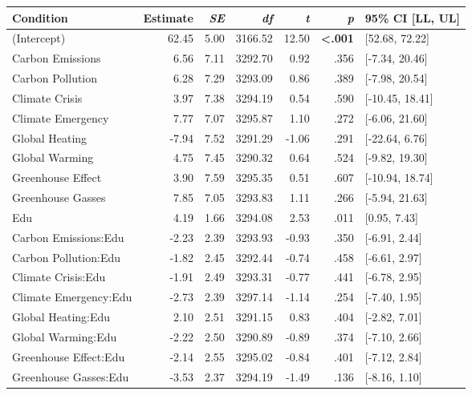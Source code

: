 \begin{table}[ht]
\centering
\begin{tabular}{lrrrrrl}
  \hline
Condition & Estimate & \textit{SE} & \textit{df} & \textit{t} & \textit{p} & 95\% CI [LL, UL] \\ 
  \hline
(Intercept) & 62.45 & 5.00 & 3166.52 & 12.50 & \textbf{\textless  .001} & [52.68, 72.22] \\ 
  Carbon Emissions & 6.56 & 7.11 & 3292.70 & 0.92 & .356 & [-7.34, 20.46] \\ 
  Carbon Pollution & 6.28 & 7.29 & 3293.09 & 0.86 & .389 & [-7.98, 20.54] \\ 
  Climate Crisis & 3.97 & 7.38 & 3294.19 & 0.54 & .590 & [-10.45, 18.41] \\ 
  Climate Emergency & 7.77 & 7.07 & 3295.87 & 1.10 & .272 & [-6.06, 21.60] \\ 
  Global Heating & -7.94 & 7.52 & 3291.29 & -1.06 & .291 & [-22.64, 6.76] \\ 
  Global Warming & 4.75 & 7.45 & 3290.32 & 0.64 & .524 & [-9.82, 19.30] \\ 
  Greenhouse Effect & 3.90 & 7.59 & 3295.35 & 0.51 & .607 & [-10.94, 18.74] \\ 
  Greenhouse Gasses & 7.85 & 7.05 & 3293.83 & 1.11 & .266 & [-5.94, 21.63] \\ 
  Edu & 4.19 & 1.66 & 3294.08 & 2.53 & .011 & [0.95, 7.43] \\ 
  Carbon Emissions:Edu & -2.23 & 2.39 & 3293.93 & -0.93 & .350 & [-6.91, 2.44] \\ 
  Carbon Pollution:Edu & -1.82 & 2.45 & 3292.44 & -0.74 & .458 & [-6.61, 2.97] \\ 
  Climate Crisis:Edu & -1.91 & 2.49 & 3293.31 & -0.77 & .441 & [-6.78, 2.95] \\ 
  Climate Emergency:Edu & -2.73 & 2.39 & 3297.14 & -1.14 & .254 & [-7.40, 1.95] \\ 
  Global Heating:Edu & 2.10 & 2.51 & 3291.15 & 0.83 & .404 & [-2.82, 7.01] \\ 
  Global Warming:Edu & -2.22 & 2.50 & 3290.89 & -0.89 & .374 & [-7.10, 2.66] \\ 
  Greenhouse Effect:Edu & -2.14 & 2.55 & 3295.02 & -0.84 & .401 & [-7.12, 2.84] \\ 
  Greenhouse Gasses:Edu & -3.53 & 2.37 & 3294.19 & -1.49 & .136 & [-8.16, 1.10] \\ 
   \hline
\end{tabular}
\end{table}
